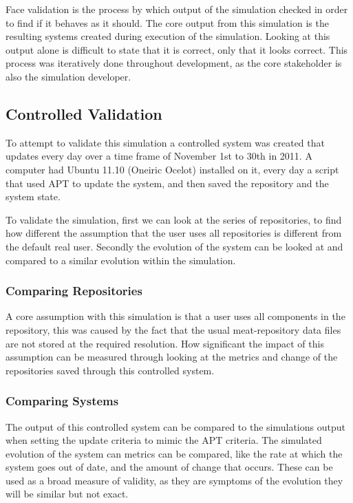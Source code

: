 Face validation is the process by which output of the simulation checked in order to find if it behaves as it should.
The core output from this simulation is the resulting systems created during execution of the simulation.
Looking at this output alone is difficult to state that it is correct, only that it looks correct.
This process was iteratively done throughout development, as the core stakeholder is also the simulation developer.

\subsection{Controlled Validation}
To attempt to validate this simulation a controlled system was created that updates every day over a time frame of November 1st to 30th in 2011.
A computer had Ubuntu 11.10 (Oneiric Ocelot) installed on it, every day a script that used APT to update the system, and then saved the repository and the system state.

To validate the simulation, first we can look at the series of repositories, to find how different the assumption that the user uses all repositories is different from the default real user.
Secondly the evolution of the system can be looked at and compared to a similar evolution within the simulation.

\subsubsection{Comparing Repositories}
A core assumption with this simulation is that a user uses all components in the repository, 
this was caused by the fact that the usual meat-repository data files are not stored at the required resolution.
How significant the impact of this assumption can be measured through looking at the metrics and change of the repositories saved through this controlled system.


\subsubsection{Comparing Systems}
The output of this controlled system can be compared to the simulations output when setting the update criteria to mimic the APT criteria.
The simulated evolution of the system can metrics can be compared, like the rate at which the system goes out of date, and the amount of change that occurs.
These can be used as a broad measure of validity, as they are symptoms of the evolution they will be similar but not exact.

